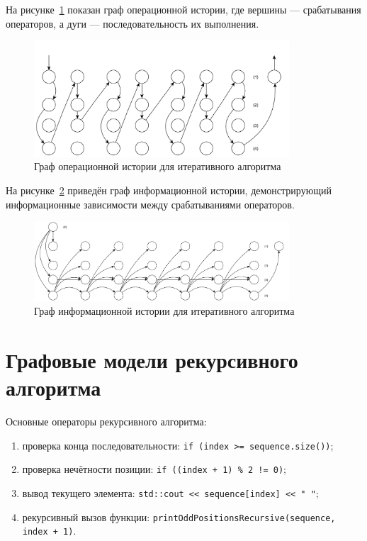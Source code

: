 На рисунке~\ref{iterative_oper_history} показан граф операционной истории, где вершины --- срабатывания операторов, а дуги --- последовательность их выполнения.

\begin{figure}[H]
	\centering
	\includegraphics[width=0.85\textwidth,keepaspectratio]{images/iterative_oper_history}
	\caption{Граф операционной истории для итеративного алгоритма}
	\label{iterative_oper_history}
\end{figure}

На рисунке~\ref{iterative_info_history} приведён граф информационной истории, демонстрирующий информационные зависимости между срабатываниями операторов.

\begin{figure}[H]
	\centering
	\includegraphics[width=0.85\textwidth,keepaspectratio]{images/iterative_info_history}
	\caption{Граф информационной истории для итеративного алгоритма}
	\label{iterative_info_history}
\end{figure}

\section{Графовые модели рекурсивного алгоритма}

Основные операторы рекурсивного алгоритма:
\begin{enumerate}
	\item проверка конца последовательности: \texttt{if (index >= sequence.size())};
	\item проверка нечётности позиции: \texttt{if ((index + 1) \% 2 != 0)};
	\item вывод текущего элемента: \texttt{std::cout << sequence[index] << " "};
	\item рекурсивный вызов функции: \texttt{printOddPositionsRecursive(sequence, index + 1)}.
\end{enumerate}

